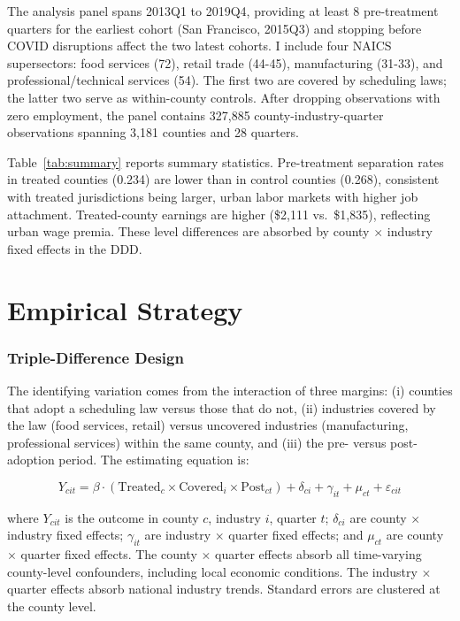 \documentclass[12pt]{article}
\begin{document}
The analysis panel spans 2013Q1 to 2019Q4, providing at least 8 pre-treatment quarters for the earliest cohort (San Francisco, 2015Q3) and stopping before COVID disruptions affect the two latest cohorts. I include four NAICS supersectors: food services (72), retail trade (44-45), manufacturing (31-33), and professional/technical services (54). The first two are covered by scheduling laws; the latter two serve as within-county controls. After dropping observations with zero employment, the panel contains 327,885 county-industry-quarter observations spanning 3,181 counties and 28 quarters.



Table~\ref{tab:summary} reports summary statistics. Pre-treatment separation rates in treated counties (0.234) are lower than in control counties (0.268), consistent with treated jurisdictions being larger, urban labor markets with higher job attachment. Treated-county earnings are higher (\$2,111 vs.\ \$1,835), reflecting urban wage premia. These level differences are absorbed by county $\times$ industry fixed effects in the DDD.

\section{Empirical Strategy}

\subsubsection*{Triple-Difference Design} The identifying variation comes from the interaction of three margins: (i) counties that adopt a scheduling law versus those that do not, (ii) industries covered by the law (food services, retail) versus uncovered industries (manufacturing, professional services) within the same county, and (iii) the pre- versus post-adoption period. The estimating equation is:

\begin{equation}
Y_{cit} = \beta \cdot (\text{Treated}_c \times \text{Covered}_i \times \text{Post}_{ct}) + \delta_{ci} + \gamma_{it} + \mu_{ct} + \varepsilon_{cit}
\label{eq:ddd}
\end{equation}

\noindent where $Y_{cit}$ is the outcome in county $c$, industry $i$, quarter $t$; $\delta_{ci}$ are county $\times$ industry fixed effects; $\gamma_{it}$ are industry $\times$ quarter fixed effects; and $\mu_{ct}$ are county $\times$ quarter fixed effects. The county $\times$ quarter effects absorb all time-varying county-level confounders, including local economic conditions. The industry $\times$ quarter effects absorb national industry trends. Standard errors are clustered at the county level.
\end{document}
